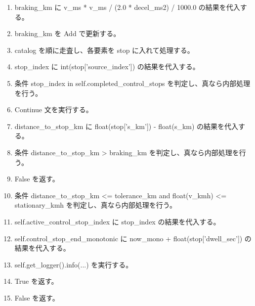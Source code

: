 \documentclass[a4paper,11pt]{article}
\begin{document}
\begin{enumerate}[leftmargin=1.8em]
\item braking\_km に v\_ms * v\_ms / (2.0 * decel\_ms2) / 1000.0 の結果を代入する。
\item braking\_km を Add で更新する。
\item catalog を順に走査し、各要素を stop に入れて処理する。
\item   stop\_index に int(stop['source\_index']) の結果を代入する。
\item   条件 stop\_index in self.completed\_control\_stops を判定し、真なら内部処理を行う。
\item     Continue 文を実行する。
\item   distance\_to\_stop\_km に float(stop['s\_km']) - float(s\_km) の結果を代入する。
\item   条件 distance\_to\_stop\_km > braking\_km を判定し、真なら内部処理を行う。
\item     False を返す。
\item   条件 distance\_to\_stop\_km <= tolerance\_km and float(v\_kmh) <= stationary\_kmh を判定し、真なら内部処理を行う。
\item     self.active\_control\_stop\_index に stop\_index の結果を代入する。
\item     self.control\_stop\_end\_monotonic に now\_mono + float(stop['dwell\_sec']) の結果を代入する。
\item     self.get\_logger().info(...) を実行する。
\item   True を返す。
\item False を返す。
            \end{enumerate}
\end{document}
